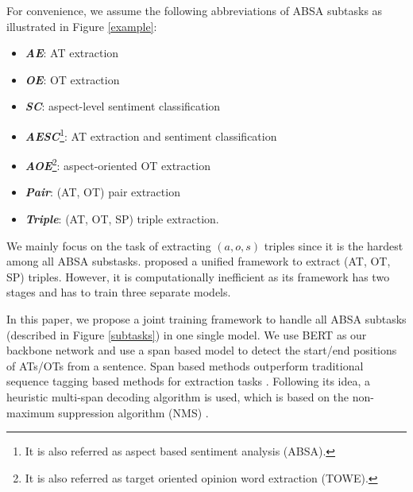 \documentclass[letterpaper]{article} \usepackage{aaai21}  \usepackage{times}  \usepackage{helvet} \usepackage{courier}  \usepackage[hyphens]{url}  \usepackage{graphicx} \urlstyle{rm} \def\UrlFont{\rm}  \usepackage{natbib}  \usepackage{caption}
\begin{document}
For convenience, we assume the following abbreviations of ABSA subtasks as illustrated in Figure \ref{example}:  
 \begin{itemize}
    \item \textbf{\emph{AE}}: AT extraction
    \item \textbf{\emph{OE}}: OT extraction
    \item \textbf{\emph{SC}}: aspect-level sentiment classification
    \item \textbf{\emph{AESC}}\footnote{It is also referred as aspect based sentiment analysis (ABSA).}: AT extraction and sentiment classification
    \item \textbf{\emph{AOE}}\footnote{It is also referred as target oriented opinion word extraction (TOWE).}: aspect-oriented OT extraction
    \item \textbf{\emph{Pair}}: (AT, OT) pair extraction 
    \item \textbf{\emph{Triple}}: (AT, OT, SP) triple extraction.
\end{itemize} 




We mainly focus on the task of extracting $(a,o,s)$ triples since it is the hardest among all ABSA substasks.   
\citet{peng2020knowing} proposed a unified framework to extract (AT, OT, SP) triples. 
However, it is computationally inefficient as its framework has two stages and has to train three separate models.


In this paper, we propose a joint training framework to handle all ABSA subtasks (described in Figure \ref{subtasks}) in one single model.
We use BERT \cite{devlin2019bert} as our backbone network and use a span based model to detect the start/end positions of ATs/OTs from a sentence.
Span based methods outperform traditional sequence tagging based methods for extraction tasks \cite{hu-etal-2019-open}.    
Following its idea, a heuristic multi-span decoding algorithm is used, which is based on the non-maximum suppression algorithm (NMS) \cite{Rosenfeld:1971:ECD}.
\end{document}
